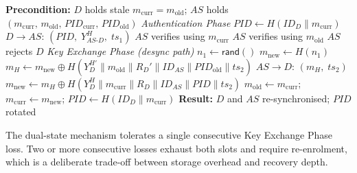 \begin{algorithm}[!ht]
\caption{Desynchronisation Recovery}
\label{alg:desync}
\begin{algorithmic}[1]
\Statex \textbf{Precondition:} $D$ holds stale $m_{\mathrm{curr}} = m_{\mathrm{old}}$;\;
       $AS$ holds $(m_{\mathrm{curr}},\,m_{\mathrm{old}},\,
       \mathit{PID}_{\mathrm{curr}},\,\mathit{PID}_{\mathrm{old}})$
\Statex
\Statex \textit{Authentication Phase}
\State $\mathit{PID} \gets H(\mathit{ID}_D \| m_{\mathrm{curr}})$
       \hfill{}
\State $D \to AS$: $(\mathit{PID},\; Y_{AS\text{-}D}^H,\; ts_1)$
    \State $AS$ verifies using $m_{\mathrm{curr}}$ \hfill{}
    \State $AS$ verifies using $m_{\mathrm{old}}$ \hfill{}
\Else
    \State $AS$ rejects $D$
\EndIf
\Statex
\Statex \textit{Key Exchange Phase (desync path)}
\State $n_1 \gets \mathsf{rand}()$
\State $m_{\mathrm{new}} \gets H(n_1)$
\State $m_H \gets m_{\mathrm{new}} \oplus
       H\!\left(Y_D^{H'} \| m_{\mathrm{old}} \| R_D' \|
       \mathit{ID}_{AS} \| \mathit{PID}_{\mathrm{old}} \| ts_2\right)$
\State $AS \to D$: $(m_H,\; ts_2)$
\State $m_{\mathrm{new}} \gets m_H \oplus
       H\!\left(Y_D^{H} \| m_{\mathrm{curr}} \| R_D \|
       \mathit{ID}_{AS} \| \mathit{PID} \| ts_2\right)$
       \hfill{}
\State $m_{\mathrm{old}} \gets m_{\mathrm{curr}}$;\quad
       $m_{\mathrm{curr}} \gets m_{\mathrm{new}}$;\quad
       $\mathit{PID} \gets H(\mathit{ID}_D \| m_{\mathrm{curr}})$
\Statex \textbf{Result:} $D$ and $AS$ re-synchronised; $\mathit{PID}$ rotated
\end{algorithmic}
\end{algorithm}

The dual-state mechanism tolerates a single consecutive Key Exchange Phase loss.
Two or more consecutive losses exhaust both slots and require re-enrolment, which
is a deliberate trade-off between storage overhead and recovery depth.
